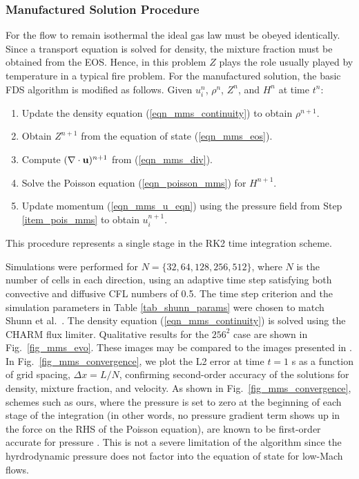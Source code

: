 \documentclass[11pt]{book}
\begin{document}
\subsubsection*{Manufactured Solution Procedure}

For the flow to remain isothermal the ideal gas law must be obeyed identically. Since a transport equation is solved for density, the mixture fraction must be obtained from the EOS.  Hence, in this problem $Z$ plays the role usually played by temperature in a typical fire problem.  For the manufactured solution, the basic FDS algorithm is modified as follows.  Given $u_i^n$, $\rho^n$, $Z^n$, and $H^n$ at time $t^n$:
\begin{enumerate}
\item \label{item_rho_mms} Update the density equation (\ref{eqn_mms_continuity}) to obtain $\rho^{n+1}$.
\item \label{item_Z_mms}   Obtain $Z^{n+1}$ from the equation of state (\ref{eqn_mms_eos}).
\item \label{item_div_mms} Compute $(\nabla\cdot \mathbf{u})^{n+1}$ from (\ref{eqn_mms_div}).
\item \label{item_pois_mms} Solve the Poisson equation (\ref{eqn_poisson_mms}) for $H^{n+1}$.
\item \label{item_mom_mms} Update momentum (\ref{eqn_mms_u_eqn}) using the pressure field from Step \ref{item_pois_mms} to obtain $u_i^{n+1}$.
\end{enumerate}
This procedure represents a single stage in the RK2 time integration scheme.

Simulations were performed for $N = \{32, 64, 128, 256, 512\}$, where $N$ is the number of cells in each direction, using an adaptive time step satisfying both convective and diffusive CFL numbers of 0.5.  The time step criterion and the simulation parameters in Table \ref{tab_shunn_params} were chosen to match Shunn et al.~\cite{Shunn:2012}. The density equation (\ref{eqn_mms_continuity}) is solved using the CHARM flux limiter. Qualitative results for the $256^2$ case are shown in Fig.~\ref{fig_mms_evo}.  These images may be compared to the images presented in \cite{Shunn:2012}.  In Fig.~\ref{fig_mms_convergence}, we plot the L2 error at time $t = 1$ s as a function of grid spacing, $\Delta x = L/N$, confirming second-order accuracy of the solutions for density, mixture fraction, and velocity.  As shown in Fig.~\ref{fig_mms_convergence}, schemes such as ours, where the pressure is set to zero at the beginning of each stage of the integration (in other words, no pressure gradient term shows up in the force on the RHS of the Poisson equation), are known to be first-order accurate for pressure \cite{Armfield:2002}. This is not a severe limitation of the algorithm since the hyrdrodynamic pressure does not factor into the equation of state for low-Mach flows.
\end{document}
